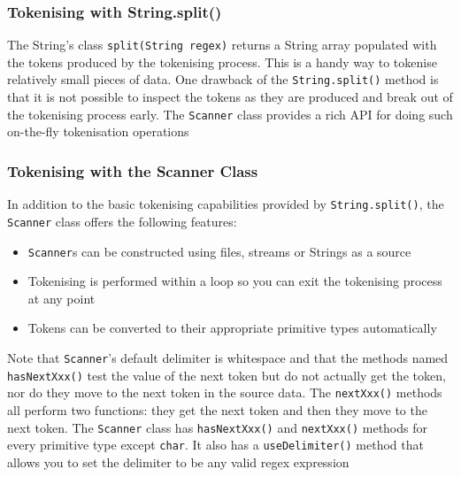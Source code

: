 \subsubsection{Tokenising with String.split()}
The String's class \verb#split(String regex)# returns a String array populated 
with the tokens produced by the tokenising process. This is a handy way to 
tokenise relatively small pieces of data. One drawback of the 
\verb#String.split()# method is that it is not possible to inspect the tokens 
as they are produced and break out of the tokenising process early. The 
\verb#Scanner# class provides a rich API for doing such on-the-fly tokenisation 
operations

\subsubsection{Tokenising with the Scanner Class}
In addition to the basic tokenising capabilities provided by 
\verb#String.split()#, the \verb#Scanner# class offers the following features:
\begin{itemize}
    \item \verb#Scanner#s can be constructed using files, streams or Strings as 
    a source
    \item Tokenising is performed within a loop so you can exit the tokenising 
    process at any point
    \item Tokens can be converted to their appropriate primitive types 
    automatically
\end{itemize}
Note that \verb#Scanner#'s default delimiter is whitespace and that the methods 
named \verb#hasNextXxx()# test the value of the next token but do not actually 
get the token, nor do they move to the next token in the source data. The 
\verb#nextXxx()# methods all perform two functions: they get the next token and 
then they move to the next token. The \verb#Scanner# class has 
\verb#hasNextXxx()# and \verb#nextXxx()# methods for every primitive type 
except \verb#char#. It also has a \verb#useDelimiter()# method that allows you 
to set the delimiter to be any valid regex expression

